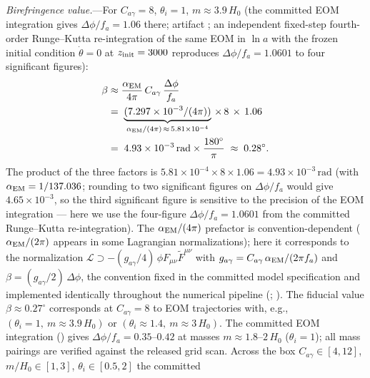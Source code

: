 \documentclass[aps,prd,twocolumn,superscriptaddress,showpacs,preprintnumbers,nofootinbib,longbibliography,floatfix]{revtex4-2}
\begin{document}
\textit{Birefringence value.}---For $C_{a\gamma}=8$, $\theta_i=1$,
$m\approx 3.9\,H_0$ (the committed EOM integration gives
$\Delta\phi/f_a = 1.06$ there; artifact
;
an independent fixed-step fourth-order Runge--Kutta re-integration of the
same EOM in $\ln a$ with the frozen initial condition
$\dot\theta=0$ at $z_{\rm init}=3000$ reproduces
$\Delta\phi/f_a = 1.0601$ to four significant figures):
\begin{equation}
\begin{aligned}
\beta &\approx \frac{\alpha_{\rm EM}}{4\pi}\,C_{a\gamma}\,
\frac{\Delta\phi}{f_a}\\
&=\; \underbrace{(7.297\times 10^{-3}/(4\pi))}_{\alpha_{\rm EM}/(4\pi)\,\approx\,5.81\times 10^{-4}}
\,\times\,8\,\times\, 1.06\\
&=\; 4.93\times 10^{-3}\,\text{rad} \times \frac{180^\circ}{\pi}
\;\approx\; 0.28^\circ.
\end{aligned}
\end{equation}
The product of the three factors is $5.81\times 10^{-4} \times 8 \times
1.06 = 4.93\times 10^{-3}\,\text{rad}$ (with $\alpha_{\rm EM}=1/137.036$;
rounding to two significant figures on $\Delta\phi/f_a$ would give
$4.65\times 10^{-3}$, so the third significant figure is sensitive to
the precision of the EOM integration --- here we use the four-figure
$\Delta\phi/f_a=1.0601$ from the committed Runge--Kutta re-integration).
The $\alpha_{\rm EM}/(4\pi)$ prefactor is convention-dependent
($\alpha_{\rm EM}/(2\pi)$ appears in some Lagrangian normalizations); here
it corresponds to the normalization
$\mathcal{L} \supset -(g_{a\gamma}/4)\,\phi F_{\mu\nu}\tilde F^{\mu\nu}$
with $g_{a\gamma} = C_{a\gamma}\,\alpha_{\rm EM}/(2\pi f_a)$ and
$\beta = (g_{a\gamma}/2)\,\Delta\phi$, the convention fixed in the
committed model specification and implemented identically throughout the
numerical pipeline
(;
).
The fiducial value $\beta\approx 0.27^\circ$ corresponds at $C_{a\gamma}=8$
to EOM trajectories with, e.g., $(\theta_i=1,\ m\approx 3.9\,H_0)$ or
$(\theta_i\approx 1.4,\ m\approx 3\,H_0)$.
The committed EOM integration ()
gives $\Delta\phi/f_a = 0.35$--$0.42$ at masses $m\approx 1.8$--$2\,H_0$
($\theta_i=1$); all mass pairings are verified against the released grid scan.
Across the box
$C_{a\gamma}\in[4,12]$, $m/H_0\in[1,3]$, $\theta_i\in[0.5,2]$ the committed
\end{document}
